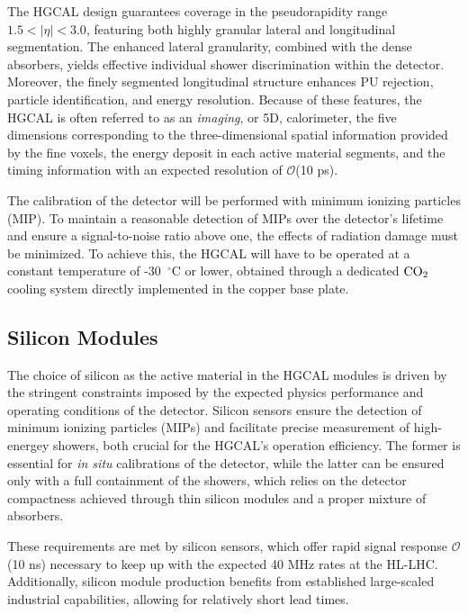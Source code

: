 \bigbreak

The HGCAL design guarantees coverage in the pseudorapidity range $1.5 < |\eta| < 3.0$, featuring both highly granular lateral and longitudinal segmentation. 
The enhanced lateral granularity, combined with the dense absorbers, yields effective individual shower discrimination within the detector. Moreover, the finely segmented longitudinal structure enhances PU rejection, particle identification, and energy resolution. Because of these features, the HGCAL is often referred to as an \textit{imaging}, or 5D, calorimeter, the five dimensions corresponding to the three-dimensional spatial information provided by the fine voxels, the energy deposit in each active material segments, and the timing information with an expected resolution of $\mathcal{O}$(10 ps).

The calibration of the detector will be performed with minimum ionizing particles (MIP). To maintain a reasonable detection of MIPs over the detector's lifetime and ensure a signal-to-noise ratio above one, the effects of radiation damage must be minimized. To achieve this, the HGCAL will have to be operated at a constant temperature of -30~$^{\circ}$C or lower, obtained through a dedicated $\textnormal{CO}_2$ cooling system directly implemented in the copper base plate. 

\subsection{Silicon Modules}
\label{sec:Silicon Modules}

The choice of silicon as the active material in the HGCAL modules is driven by the stringent constraints imposed by the expected physics performance and operating conditions of the detector. 
Silicon sensors ensure the detection of minimum ionizing particles (MIPs) and facilitate precise measurement of high-energey showers, both crucial for the HGCAL's operation efficiency. The former is essential for \textit{in situ} calibrations of the detector, while the latter can be ensured only with a full containment of the showers, which relies on the detector compactness achieved through thin silicon modules and a proper mixture of absorbers.

These requirements are met by silicon sensors, which offer rapid signal response $\mathcal{O}$(10 ns) necessary to keep up with the expected 40 MHz rates at the HL-LHC. Additionally, silicon module production benefits from established large-scaled industrial capabilities, allowing for relatively short lead times.

